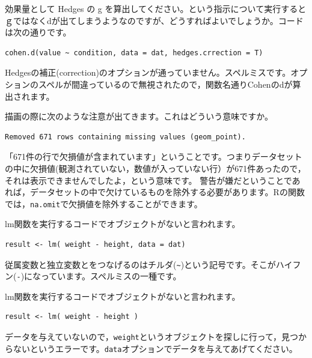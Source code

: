 \documentclass{ltjsbook}
\begin{document}
\begin{FAQ}{効果量として Hedges の g を算出してください。という指示について実行するとｇではなくdが出てしまうようなのですが、どうすればよいでしょうか。コードは次の通りです。}{}
	\begin{verbatim}
cohen.d(value ~ condition, data = dat, hedges.crrection = T)
\end{verbatim}
	Hedgesの補正(correction)のオプションが通っていません。スペルミスです。オプションのスペルが間違っているので無視されたので，関数名通りCohenのdが算出されます。
\end{FAQ}


\begin{FAQ}{描画の際に次のような注意が出てきます。これはどういう意味ですか。}{}
	\begin{verbatim}Removed 671 rows containing missing values (geom_point).\end{verbatim}
	「671件の行で欠損値が含まれています」ということです。つまりデータセットの中に欠損値(観測されていない，数値が入っていない行）が671件あったので，それは表示できませんでしたよ，という意味です。
	警告が嫌だということであれば，データセットの中で欠けているものを除外する必要があります。Rの関数では，\verb|na.omit|で欠損値を除外することができます。
\end{FAQ}

\begin{FAQ}{lm関数を実行するコードでオブジェクトがないと言われます。}{}
	\begin{verbatim}
result <- lm( weight - height, data = dat)
\end{verbatim}
	従属変数と独立変数とをつなげるのはチルダ(\verb|~|)という記号です。そこがハイフン(\verb|-|)になっています。スペルミスの一種です。
\end{FAQ}

\begin{FAQ}{lm関数を実行するコードでオブジェクトがないと言われます。}{}
	\begin{verbatim}
result <- lm( weight - height )
\end{verbatim}
	データを与えていないので，\verb|weight|というオブジェクトを探しに行って，見つからないというエラーです。\verb|data|オプションでデータを与えてあげてください。
\end{FAQ}
\end{document}
